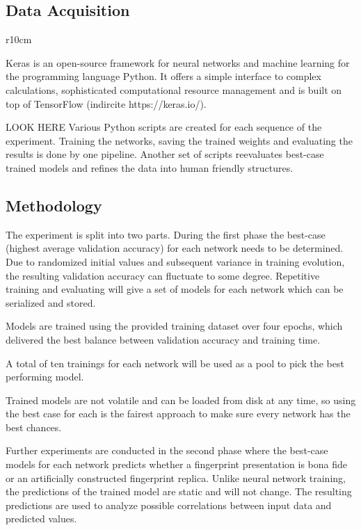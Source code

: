 \subsection{Data Acquisition}
\begin{wrapfigure}[13]{r}{10cm}
    
\end{wrapfigure}
Keras is an open-source framework for neural networks and machine learning for the programming language Python.
It offers a simple interface to complex calculations, sophisticated computational resource management and is built on top of TensorFlow (indircite https://keras.io/).

LOOK  HERE Various Python scripts are created for each sequence of the experiment.
Training the networks, saving the trained weights and evaluating the results is done by one pipeline.
Another set of scripts reevaluates best-case trained models and refines the data into human friendly structures.




\subsection{Methodology}
The experiment is split into two parts.
During the first phase the best-case (highest average validation accuracy) for each network needs to be determined.
Due to randomized initial values and subsequent variance in training evolution, the resulting validation accuracy can fluctuate to some degree.
Repetitive training and evaluating will give a set of models for each network which can be serialized and stored.

Models are trained using the provided training dataset over four epochs, which delivered the best balance between validation accuracy and training time.

A total of ten trainings for each network will be used as a pool to pick the best performing model.

\noindent
Trained models are not volatile and can be loaded from disk at any time, so using the best case for each is the fairest approach to make sure every network has the best chances.


\medskip\noindent
Further experiments are conducted in the second phase where the best-case models for each network predicts whether a fingerprint presentation is bona fide or an artificially constructed fingerprint replica.
Unlike neural network training, the predictions of the trained model are static and will not change.
The resulting predictions are used to analyze possible correlations between input data and predicted values.

